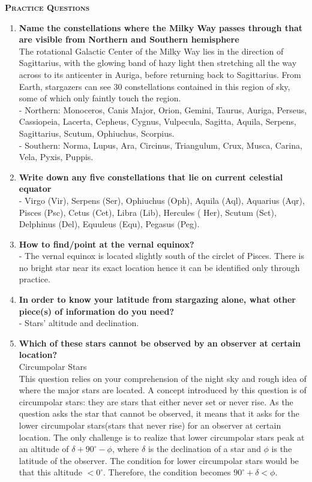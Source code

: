 \documentclass[a4paper,12pt]{extarticle}
\begin{document}
\textsc{\textbf{Practice Questions}}
\begin{enumerate}
	\item \textbf{Name the constellations where the Milky Way passes through that are visible from Northern and Southern hemisphere}\\
	The rotational Galactic Center of the Milky Way lies in the direction of Sagittarius, with the glowing band of hazy light then stretching all the way across to its anticenter in Auriga, before returning back to Sagittarius. From Earth, stargazers can see 30 constellations contained in this region of sky, some of which only faintly touch the region.\\
	
	- \textsf{Northern}: Monoceros, Canis Major, Orion, Gemini, Taurus, Auriga, Perseus, Cassiopeia, Lacerta, Cepheus, Cygnus, Vulpecula, Sagitta, Aquila, Serpens, Sagittarius, Scutum, Ophiuchus, Scorpius.\\
	
	- \textsf{Southern}: Norma, Lupus, Ara, Circinus, Triangulum, Crux, Musca, Carina, Vela, Pyxis, Puppis.
	

	\item \textbf{Write down any five constellations that lie on current celestial equator}\\
	- Virgo (Vir), Serpens (Ser), Ophiuchus (Oph), Aquila (Aql), Aquarius (Aqr), Pisces (Psc), Cetus (Cet), Libra (Lib), Hercules ( Her), Scutum (Sct), Delphinus (Del), Equuleus (Equ), Pegasus (Peg).
	\item \textbf{How to find/point at the vernal equinox?}\\
	- The vernal equinox is located slightly south of the circlet of Pisces. There is no bright star near its exact location hence it can be identified only through practice.
	\item \textbf{In order to know your latitude from stargazing alone, what other piece(s) of information do you need?}\\
	- Stars' altitude and declination.
	
	\item \textbf{Which of these stars cannot be observed by an observer at certain location?}\\
	
	\textsf{Circumpolar Stars}\\
	
	This question relies on your comprehension of the night sky and rough idea of where the major stars are located. A concept introduced by this question is of circumpolar stars: they are stars that either never set or never rise. As the question asks the star that cannot be observed, it means that it asks for the lower circumpolar stars(stars that never rise) for an observer at certain location.
	The only challenge is to realize that lower circumpolar stars peak at an altitude of $\delta+ 90^\circ -\phi$,
	where $\delta$ is the declination of a star and $\phi$ is the latitude of the observer. The condition for lower
	circumpolar stars would be that this altitude $< 0^\circ$. Therefore, the condition becomes $90^\circ + \delta <\phi$.
	

\end{enumerate}
\end{document}
